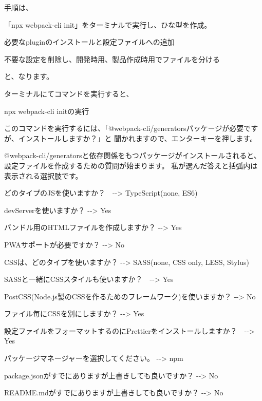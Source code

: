 手順は、

\begin{starterenumerate}
\item 「npx webpack{-}cli init」をターミナルで実行し、ひな型を作成。
\item 必要なpluginのインストールと設定ファイルへの追加
\item 不要な設定を削除し、開発時用、製品作成時用でファイルを分ける
\end{starterenumerate}

と、なります。

ターミナルにてコマンドを実行すると、\\[0pt]

\def\startercodeblockfontsize{}
\begin{starterterminal}[]{npx webpack{-}cli initの実行}\end{starterterminal}

このコマンドを実行するには、「@webpack{-}cli/generatorsパッケージが必要ですが、インストールしますか？」と
聞かれますので、エンターキーを押します。

\vspace*{\baselineskip}

@webpack{-}cli/generatorsと依存関係をもつパッケージがインストールされると、設定ファイルを作成するための質問が始まります。
私が選んだ答えと括弧内は表示される選択肢です。

\vspace*{\baselineskip}

\begin{starteritemize}
\item どのタイプのJSを使いますか？　{-}{-}\textgreater{} TypeScript(none, ES6)
\item devServerを使いますか？ {-}{-}\textgreater{} Yes
\item バンドル用のHTMLファイルを作成しますか？ {-}{-}\textgreater{} Yes
\item PWAサポートが必要ですか？ {-}{-}\textgreater{} No
\item CSSは、どのタイプを使いますか？ {-}{-}\textgreater{} SASS(none, CSS only, LESS, Stylus)
\item SASSと一緒にCSSスタイルも使いますか？　{-}{-}\textgreater{} Yes
\item PostCSS(Node.js製のCSSを作るためのフレームワーク)を使いますか？ {-}{-}\textgreater{} No
\item ファイル毎にCSSを別にしますか？ {-}{-}\textgreater{} Yes
\item 設定ファイルをフォーマットするのにPrettierをインストールしますか？　{-}{-}\textgreater{} Yes
\item パッケージマネージャーを選択してください。 {-}{-}\textgreater{} npm
\item package.jsonがすでにありますが上書きしても良いですか？ {-}{-}\textgreater{} No
\item README.mdがすでにありますが上書きしても良いですか？ {-}{-}\textgreater{} No
\end{starteritemize}

